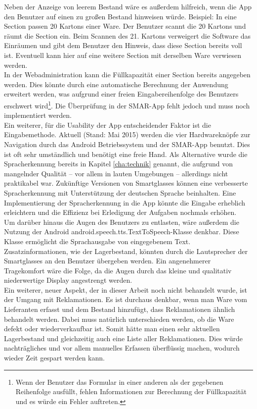 Neben der Anzeige von leerem Bestand wäre es außerdem hilfreich, wenn die App den Benutzer auf einen zu großen Bestand hinweisen würde.
Beispiel: In eine Section passen 20 Kartons einer Ware. Der Benutzer scannt die 20 Kartons und räumt die Section ein. Beim Scannen des 21. Kartons verweigert die Software das Einräumen und gibt dem Benutzer den Hinweis, dass diese Section bereits voll ist. Eventuell kann hier auf eine weitere Section mit derselben Ware verwiesen werden.\\
In der Webadministration kann die Füllkapazität einer Section bereits angegeben werden. Dies könnte durch eine automatische Berechnung der Anwendung erweitert werden, was aufgrund einer freien Eingabereihenfolge des Benutzers erschwert wird\footnote{Wenn der Benutzer das Formular in einer anderen als der gegebenen Reihenfolge ausfüllt, fehlen Informationen zur Berechnung der Füllkapazität und es würde ein Fehler auftreten.}. Die Überprüfung in der \ac{SMAR}-App fehlt jedoch und muss noch implementiert werden.\\

Ein weiterer, für die Usability der App entscheidender Faktor ist die Eingabemethode. Aktuell (Stand: Mai 2015) werden die vier Hardwareknöpfe zur Navigation durch das Android Betriebssystem und der \ac{SMAR}-App benutzt. Dies ist oft sehr umständlich und benötigt eine freie Hand. Als Alternative wurde die Spracherkennung bereits in Kapitel \ref{cha:technik}  genannt, die aufgrund von mangelnder Qualität -- vor allem in lauten Umgebungen -- allerdings nicht praktikabel war. Zukünftige Versionen von Smartglasses können eine verbesserte Spracherkennung mit Unterstützung der deutschen Sprache beinhalten. Eine Implementierung der Spracherkennung in die App könnte die Eingabe erheblich erleichtern und die Effizienz bei Erledigung der Aufgaben nochmals erhöhen.\\
Um darüber hinaus die Augen des Benutzers zu entlasten, wäre außerdem die Nutzung der Android \glqq android.speech.tts.TextToSpeech\grqq -Klasse denkbar. Diese Klasse ermöglicht die Sprachausgabe von eingegebenem Text. Zusatzinformationen, wie \zB der Lagerbestand, könnten durch die Lautsprecher der Smartglasses an den Benutzer übergeben werden. Ein angenehmerer Tragekomfort wäre die Folge, da die Augen durch das kleine und qualitativ niederwertige Display angestrengt werden.\\

Ein weiterer, neuer Aspekt, der in dieser Arbeit noch nicht behandelt wurde, ist der Umgang mit Reklamationen. Es ist durchaus denkbar, wenn man Ware vom Lieferanten erfasst und dem Bestand hinzufügt, dass Reklamationen ähnlich behandelt werden. Dabei muss natürlich unterschieden werden, ob die Ware defekt oder wiederverkaufbar ist. Somit hätte man einen sehr aktuellen Lagerbestand und gleichzeitig auch eine Liste aller Reklamationen. Dies würde nachträgliches und vor allem manuelles Erfassen überflüssig machen, wodurch wieder Zeit gespart werden kann. \\

